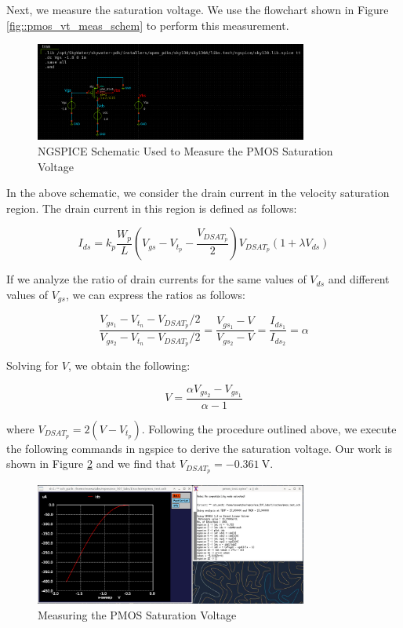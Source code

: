 \documentclass[fleqn]{article}
\begin{document}
	Next, we measure the saturation voltage. We use the flowchart shown in Figure \ref{fig::pmos_vt_meas_schem} to perform this measurement.
	
	\begin{figure}[H]
		\centerline{\includegraphics[width=0.8\textwidth]{pmos_vdsat_meas_schem.png}}
		\caption{NGSPICE Schematic Used to Measure the PMOS Saturation Voltage}
		\label{fig::pmos_vdsat_meas_schem}
	\end{figure}
	
	 \noindent In the above schematic, we consider the drain current in the velocity saturation region. The drain current in this region is defined as follows:
	
	\begin{equation}
		\label{eq::pmos_sat_current}
		I_{ds} = k_p\frac{W_p}{L}\left(V_{gs} - V_{t_p} - \frac{V_{DSAT_p}}{2}\right)V_{DSAT_p}(1 + {\lambda}V_{ds})
	\end{equation}
	
	\noindent If we analyze the ratio of drain currents for the same values of $V_{ds}$ and different values of $V_{gs}$, we can express the ratios as follows:
	
	\begin{equation}
		\frac{V_{gs_1} - V_{t_n} - V_{DSAT_p}/2}{V_{gs_2} - V_{t_n} - V_{DSAT_p}/2} = \frac{V_{gs_1} - V}{V_{gs_2} - V} = \frac{I_{ds_1}}{I_{ds_2}} = \alpha
	\end{equation}
	
	\noindent Solving for $V$, we obtain the following:
	
	\begin{equation}
		V = \frac{{\alpha}V_{gs_2} - V_{gs_1}}{\alpha - 1}
	\end{equation}
	
	\noindent where $V_{DSAT_p} = 2(V - V_{t_p})$. Following the procedure outlined above, we execute the following commands in ngspice to derive the saturation voltage. Our work is shown in Figure \ref{fig::pmos_vdsat_meas} and we find that $V_{DSAT_p} = -0.361\ \text{V}$.
	
	\begin{figure}[H]
		\centerline{\includegraphics[width=0.8\textwidth]{pmos_vdsat_meas.png}}
		\caption{Measuring the PMOS Saturation Voltage}
		\label{fig::pmos_vdsat_meas}
	\end{figure}
	
\end{document}
